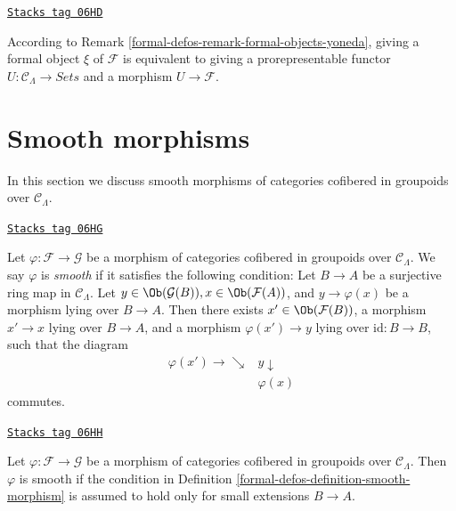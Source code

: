 \begin{remark}
\label{formal-defos-remark-spell-out-formal-object}
\href{https://stacks.math.columbia.edu/tag/06HD}{\texttt{Stacks tag 06HD}}

According to Remark \ref{formal-defos-remark-formal-objects-yoneda}, giving a formal object
$\xi$ of $\mathcal{F}$ is equivalent to giving a prorepresentable functor
$U : \mathcal{C}_\Lambda \to \textit{Sets}$ and a morphism
$U \to \mathcal{F}$.
\end{remark}

\section{Smooth morphisms}
\label{formal-defos-section-smooth-morphisms}
In this section we discuss smooth morphisms of categories
cofibered in groupoids over $\mathcal{C}_\Lambda$.

\begin{definition}
\label{formal-defos-definition-smooth-morphism}
\href{https://stacks.math.columbia.edu/tag/06HG}{\texttt{Stacks tag 06HG}}

Let $\varphi : \mathcal{F} \to \mathcal{G}$ be a morphism of categories
cofibered in groupoids over $\mathcal{C}_\Lambda$.  We say  $\varphi$ is
{\it smooth} if it satisfies the following condition: Let $B \to A$ be
a surjective ring map in $\mathcal{C}_\Lambda$.  Let $y \in
\Ob(\mathcal{G}(B)), x \in \Ob(\mathcal{F}(A))$, and $y
\to \varphi(x)$ be a morphism lying over $B \to A$.  Then there
exists $x' \in \Ob(\mathcal{F}(B))$, a morphism $x' \to x$
lying over $B \to A$, and a morphism $\varphi(x') \to y$ lying
over $\text{id}: B \to B$, such that the diagram
$$
\begin{array}{cc}\varphi(x') \longrightarrow\searrow & y \downarrow \\  & \varphi(x)\end{array}
$$
commutes.
\end{definition}

\begin{lemma}
\label{formal-defos-lemma-smoothness-small-extensions}
\href{https://stacks.math.columbia.edu/tag/06HH}{\texttt{Stacks tag 06HH}}

Let $\varphi : \mathcal{F} \to \mathcal{G}$ be a morphism of categories
cofibered in groupoids over $\mathcal{C}_\Lambda$.  Then $\varphi$ is smooth
if the condition in Definition \ref{formal-defos-definition-smooth-morphism} is assumed to
hold only for small extensions $B \to A$.
\end{lemma}

